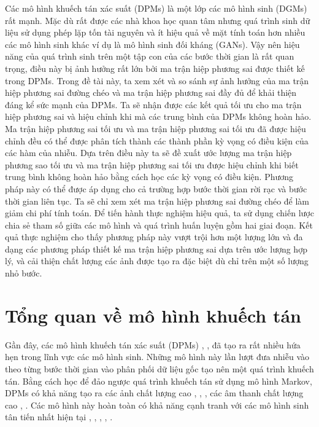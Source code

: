 \documentclass[14pt, a4paper]{article}
\numberwithin{equation}{section}
\numberwithin{figure}{section}
\numberwithin{dl}{section}
\numberwithin{md}{section}
\numberwithin{bd}{section}
\numberwithin{dn}{section}
\numberwithin{hq}{section}
\begin{document}
    Các mô hình khuếch tán xác suất (DPMs) là một lớp các mô hình sinh (DGMs) rất mạnh.
    Mặc dù rất được các nhà khoa học quan tâm nhưng quá trình sinh dữ liệu sử dụng phép lặp tốn tài nguyên và ít hiệu quả về mặt tính toán hơn nhiều các mô hình sinh khác ví dụ là mô hình sinh đối kháng (GANs).
    Vậy nên hiệu năng của quá trình sinh trên một tập con của các bước thời gian là rất quan trọng,
    điều này bị ảnh hưởng rất lớn bởi ma trận hiệp phương sai được thiết kế trong DPMs.
    Trong đề tài này, ta xem xét và so sánh sự ảnh hưởng của ma trận hiệp phương sai đường chéo và ma trận hiệp phương sai đầy đủ để khải thiện đáng kể sức mạnh của DPMs.
    Ta sẽ nhận được các kết quả tối ưu cho ma trận hiệp phương sai và hiệu chỉnh khi mà các trung bình của DPMs không hoàn hảo.
    Ma trận hiệp phương sai tối ưu và ma trận hiệp phương sai tối ưu đã được hiệu chỉnh đều có thể được phân tích thành các thành phần kỳ vọng có điều kiện của các hàm của nhiễu.
    Dựa trên điều này ta sẽ đề xuất ước lượng ma trận hiệp phương sao tối ưu và ma trận hiệp phương sai tối ưu được hiệu chỉnh khi biết trung bình không hoàn hảo bằng cách học các kỳ vọng có điều kiện.
    Phương pháp này có thể được áp dụng cho cả trường hợp bước thời gian rời rạc và bước thời gian liên tục.
    Ta sẽ chỉ xem xét ma trận hiệp phương sai đường chéo để làm giảm chi phí tính toán.
    Để tiến hành thực nghiệm hiệu quả, ta sử dụng chiến lược chia sẻ tham số giữa các mô hình và quá trình huấn luyện gồm hai giai đoạn.
    Kết quả thực nghiệm cho thấy phương pháp này vượt trội hơn một lượng lớn và đa dạng các phương pháp thiết kế ma trận hiệp phương sai dựa trên ước lượng hợp lý,
    và cải thiện chất lượng các ảnh được tạo ra đặc biệt dù chỉ trên một số lượng nhỏ bước.
    

        
    \newpage

    \section{Tổng quan về mô hình khuếch tán} \label{Introduction}

    Gần đây, các mô hình khuếch tán xác suất (DPMs) \cite{sohl2015deep}, \cite{ho2020denoising}, \cite{song2020score} đã tạo ra rất nhiều hứa hẹn trong lĩnh vực các mô hình sinh.
    Những mô hình này lần lượt đưa nhiễu vào theo từng bước thời gian vào phân phối dữ liệu gốc tạo nên một quá trình khuếch tán.
    Bằng cách học để đảo ngược quá trình khuếch tán sử dụng mô hình Markov, DPMs có khả năng tạo ra các ảnh chất lượng cao \cite{ho2020denoising}, \cite{song2020score}, \cite{dhariwal2021diffusion},
    các âm thanh chất lượng cao \cite{chen2020wavegrad}, \cite{kong2020diffwave}. 
    Các mô hình này hoàn toàn có khả năng cạnh tranh với các mô hình sinh tân tiến nhất hiện tại \cite{brock2018large}, \cite{wu2019logan}, \cite{karras2020analyzing}, \cite{binkowski2019high}, \cite{kalchbrenner2018efficient}.
\end{document}
